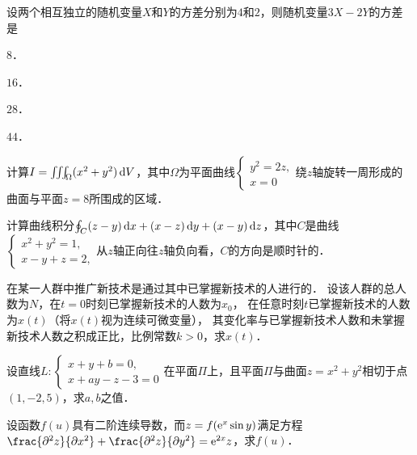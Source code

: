 \documentclass[plain,noanswer,medmath]{../../template/jnuexam}
\begin{document}
\begin{problem}
设两个相互独立的随机变量$X$和$Y$的方差分别为$4$和$2$，则随机变量$3X - 2Y$的方差是\pickout{}
\begin{abcd}
\item $8$．        
\item $16$．        
\item $28$．        
\item $44$．
\end{abcd}
\end{problem}




\begin{problem}
计算$I = \iiint_{\Omega}(x^2 + y^2) \d V$，其中$\Omega$为平面曲线$\begin{cases}
  y^2 = 2z, \\
  x = 0
\end{cases}$绕$z$轴旋转一周形成的曲面与平面$z = 8$所围成的区域．
\end{problem}


\begin{problem}
计算曲线积分$\oint_C (z - y)\mathop{}\!\mathrm{d} x + (x - z)\mathop{}\!\mathrm{d} y + (x - y)\mathop{}\!\mathrm{d} z$，其中$C$是曲线$\begin{cases}
  x^2 + y^2 = 1, \\
  x - y + z = 2,
\end{cases}$从$z$轴正向往$z$轴负向看，$C$的方向是顺时针的．
\end{problem}


\begin{problem}
在某一人群中推广新技术是通过其中已掌握新技术的人进行的．
设该人群的总人数为$N$，在$t = 0$时刻已掌握新技术的人数为$x_0$，
在任意时刻$t$已掌握新技术的人数为$x(t)$（将$x(t)$视为连续可微变量），
其变化率与已掌握新技术人数和未掌握新技术人数之积成正比，比例常数$k > 0$，求$x(t)$．
\end{problem}




\begin{problem}
设直线$L:\begin{cases}
  x + y + b = 0, \\
  x + ay - z - 3 = 0
\end{cases}$在平面$\Pi$上，且平面$\Pi$与曲面$z = x^2 + y^2$相切于点$(1, - 2,5)$，求$a,b$之值．
\end{problem}


\begin{problem}
设函数$f(u)$具有二阶连续导数，而$z = f(\mathrm{e}^x\sin y)$满足方程
$\frac{\pd^2 z}{\pd x^2} + \frac{\pd^2 z}{\pd y^2} = \e^{2x} z$，求$f(u)$．
\end{problem}
\end{document}
